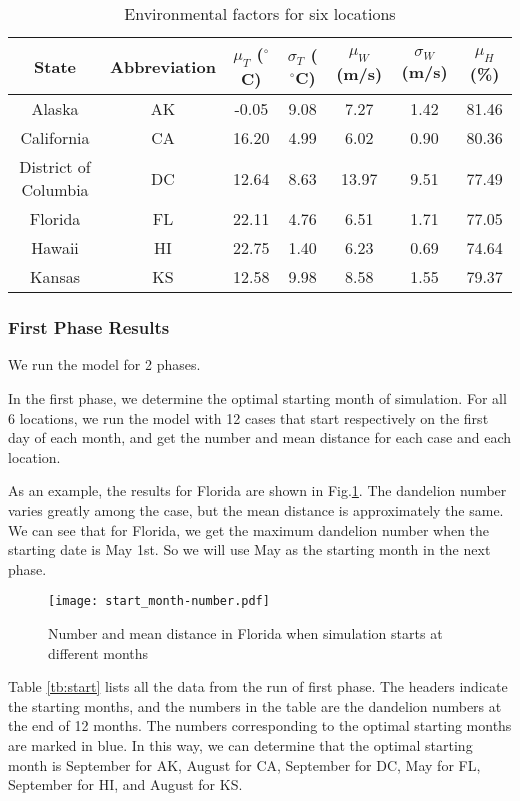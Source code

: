 \documentclass[12pt]{article}
\begin{document}
			{
				\fontsize{10}{14}\selectfont
				{
					\begin{longtable}{ccccccc}
						\caption{Environmental factors for six locations}
						\label{tb:locs}\\
						\toprule
						State&Abbreviation&$\mu_T$ ($^\circ$C)&$\sigma_T$ ($^\circ$C)&$\mu_W$ (m/s)&$\sigma_W$ (m/s)&$\mu_H$ (\%)\\
						\toprule
						Alaska&AK&-0.05&9.08&7.27&1.42&81.46\\
						California&CA&16.20&4.99&6.02&0.90&80.36\\
						District of Columbia&DC&12.64&8.63&13.97&9.51&77.49\\
						Florida&FL&22.11&4.76&6.51&1.71&77.05\\
						Hawaii&HI&22.75&1.40&6.23&0.69&74.64\\
						Kansas&KS&12.58&9.98&8.58&1.55&79.37\\
						\bottomrule
					\end{longtable}
				}
			}
			\newpage
			
		\subsubsection{First Phase Results}	
			We run the model for 2 phases.
			
			In the first phase, we determine the optimal starting month of simulation.  For all 6 locations, we run the model with 12 cases that start respectively on the first day of each month, and get the number and mean distance for each case and each location.
			
			As an example, the results for Florida are shown in Fig.\ref{fig:start}.  The dandelion number varies greatly among the case, but the mean distance is approximately the same.  We can see that for Florida, we get the maximum dandelion number when the starting date is May 1st.  So we will use May as the starting month in the next phase.
			
			\begin{figure}[htbp]
				\centering
				\texttt{[image: start\_month-number.pdf]}
				\caption{Number and mean distance in Florida when simulation starts at different months}
				\label{fig:start}
			\end{figure}
			
			Table \ref{tb:start} lists all the data from the run of first phase.  The headers indicate the starting months, and the numbers in the table are the dandelion numbers at the end of 12 months.  The numbers corresponding to the optimal starting months are marked in blue.  In this way, we can determine that the optimal starting month is September for AK, August for CA, September for DC, May for FL, September for HI, and August for KS.
			
\end{document}
